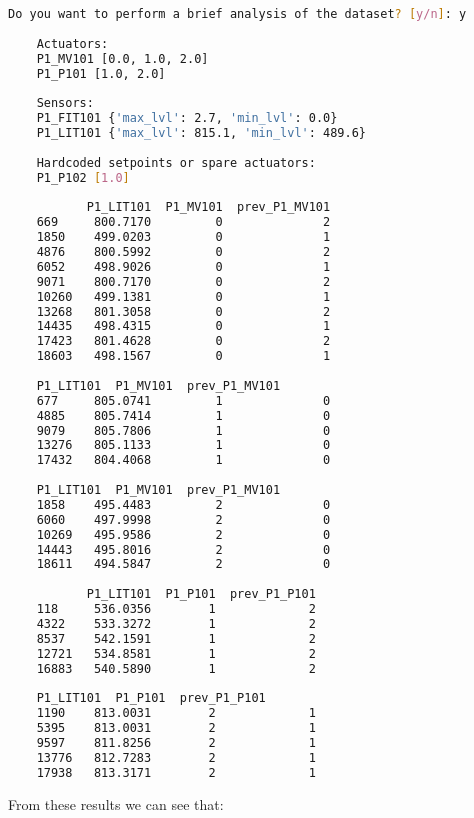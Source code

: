 \begin{lstlisting}[language=bash,numbers=none,caption={Example of preliminar system analysis},label=lst:4_brief_infos]
	Do you want to perform a brief analysis of the dataset? [y/n]: y
	
	Actuators: 
	P1_MV101 [0.0, 1.0, 2.0]
	P1_P101 [1.0, 2.0]
	
	Sensors: 
	P1_FIT101 {'max_lvl': 2.7, 'min_lvl': 0.0}
	P1_LIT101 {'max_lvl': 815.1, 'min_lvl': 489.6}
	
	Hardcoded setpoints or spare actuators: 
	P1_P102 [1.0]
	
	       P1_LIT101  P1_MV101  prev_P1_MV101
	669     800.7170         0              2
	1850    499.0203         0              1
	4876    800.5992         0              2
	6052    498.9026         0              1
	9071    800.7170         0              2
	10260   499.1381         0              1
	13268   801.3058         0              2
	14435   498.4315         0              1
	17423   801.4628         0              2
	18603   498.1567         0              1
	
	P1_LIT101  P1_MV101  prev_P1_MV101
	677     805.0741         1              0
	4885    805.7414         1              0
	9079    805.7806         1              0
	13276   805.1133         1              0
	17432   804.4068         1              0
	
	P1_LIT101  P1_MV101  prev_P1_MV101
	1858    495.4483         2              0
	6060    497.9998         2              0
	10269   495.9586         2              0
	14443   495.8016         2              0
	18611   494.5847         2              0
	
	       P1_LIT101  P1_P101  prev_P1_P101
	118     536.0356        1             2
	4322    533.3272        1             2
	8537    542.1591        1             2
	12721   534.8581        1             2
	16883   540.5890        1             2
	
	P1_LIT101  P1_P101  prev_P1_P101
	1190    813.0031        2             1
	5395    813.0031        2             1
	9597    811.8256        2             1
	13776   812.7283        2             1
	17938   813.3171        2             1
\end{lstlisting}

From these results we can see that: 

